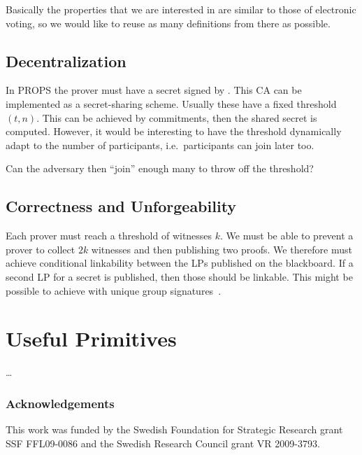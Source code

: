 Basically the properties that we are interested in are similar to those of 
electronic voting, so we would like to reuse as many definitions from there as 
possible.

\subsection{Decentralization}

In \ac{PROPS} the prover must have a secret signed by .
This \ac{CA} can be implemented as a secret-sharing scheme.
Usually these have a fixed threshold \((t, n)\).
This can be achieved by commitments, then the shared secret is computed.
However, it would be interesting to have the threshold dynamically adapt to the 
number of participants, i.e.\ participants can join later too.

Can the adversary then \enquote{join} enough many to throw off the threshold?

\subsection{Correctness and Unforgeability}

Each prover must reach a threshold of witnesses \(k\).
We must be able to prevent a prover to collect \(2k\) witnesses and then 
publishing two proofs.
We therefore must achieve conditional linkability between the \acp{LP} 
published on the blackboard.
If a second \ac{LP} for a secret is published, then those should be linkable.
This might be possible to achieve with unique group 
signatures~\cite{UniqueGroupSignatures,UniqueRingSignatures,ListSignatures}.


\section{Useful Primitives}
\label{UsefulPrimitives}

\dots


\subsubsection*{Acknowledgements}

This work was funded by the Swedish Foundation for Strategic Research grant SSF 
FFL09-0086 and the Swedish Research Council grant VR 2009-3793.


\printbibliography{}
